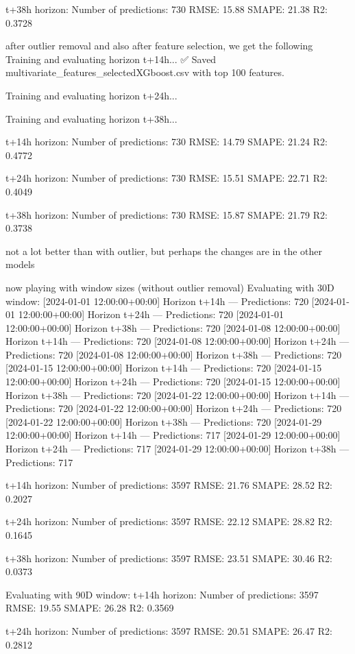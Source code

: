 t+38h horizon:
Number of predictions: 730
RMSE: 15.88
SMAPE: 21.38%
R2: 0.3728

after outlier removal and also after feature selection, we get the following
Training and evaluating horizon t+14h...
✅ Saved multivariate_features_selectedXGboost.csv with top 100 features.

Training and evaluating horizon t+24h...

Training and evaluating horizon t+38h...

t+14h horizon:
Number of predictions: 730
RMSE: 14.79
SMAPE: 21.24%
R2: 0.4772

t+24h horizon:
Number of predictions: 730
RMSE: 15.51
SMAPE: 22.71%
R2: 0.4049

t+38h horizon:
Number of predictions: 730
RMSE: 15.87
SMAPE: 21.79%
R2: 0.3738

not a lot better than with outlier, but perhaps the changes are in the other models

now playing with window sizes (without outlier removal)
Evaluating with 30D window:
[2024-01-01 12:00:00+00:00] Horizon t+14h — Predictions: 720
[2024-01-01 12:00:00+00:00] Horizon t+24h — Predictions: 720
[2024-01-01 12:00:00+00:00] Horizon t+38h — Predictions: 720
[2024-01-08 12:00:00+00:00] Horizon t+14h — Predictions: 720
[2024-01-08 12:00:00+00:00] Horizon t+24h — Predictions: 720
[2024-01-08 12:00:00+00:00] Horizon t+38h — Predictions: 720
[2024-01-15 12:00:00+00:00] Horizon t+14h — Predictions: 720
[2024-01-15 12:00:00+00:00] Horizon t+24h — Predictions: 720
[2024-01-15 12:00:00+00:00] Horizon t+38h — Predictions: 720
[2024-01-22 12:00:00+00:00] Horizon t+14h — Predictions: 720
[2024-01-22 12:00:00+00:00] Horizon t+24h — Predictions: 720
[2024-01-22 12:00:00+00:00] Horizon t+38h — Predictions: 720
[2024-01-29 12:00:00+00:00] Horizon t+14h — Predictions: 717
[2024-01-29 12:00:00+00:00] Horizon t+24h — Predictions: 717
[2024-01-29 12:00:00+00:00] Horizon t+38h — Predictions: 717

t+14h horizon:
Number of predictions: 3597
RMSE: 21.76
SMAPE: 28.52%
R2: 0.2027

t+24h horizon:
Number of predictions: 3597
RMSE: 22.12
SMAPE: 28.82%
R2: 0.1645

t+38h horizon:
Number of predictions: 3597
RMSE: 23.51
SMAPE: 30.46%
R2: 0.0373

Evaluating with 90D window:
t+14h horizon:
Number of predictions: 3597
RMSE: 19.55
SMAPE: 26.28%
R2: 0.3569

t+24h horizon:
Number of predictions: 3597
RMSE: 20.51
SMAPE: 26.47%
R2: 0.2812

